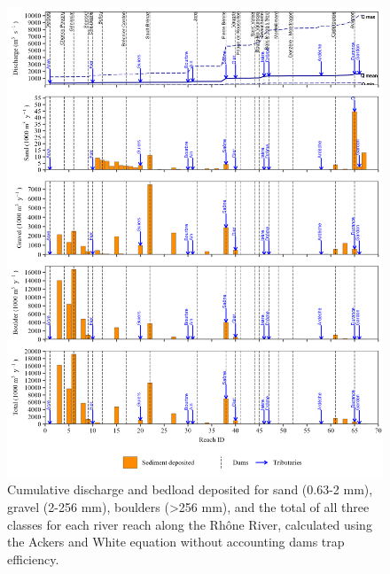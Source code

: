 \documentclass[
]{book}
\begin{document}
\begin{figure}
\includegraphics[width=26.24in]{img/res_cascade/res_E0_eA&W_noDams/plots_dep-silt/dep_res_sum_hy_E0_eA&W_noDams} \caption{Cumulative discharge and bedload deposited for sand (0.63-2 mm), gravel (2-256 mm), boulders (>256 mm), and the total of all three classes for each river reach along the Rhône River, calculated using the Ackers and White equation without accounting dams trap efficiency.}\label{fig:DepE0eA}
\end{figure}
\end{document}
